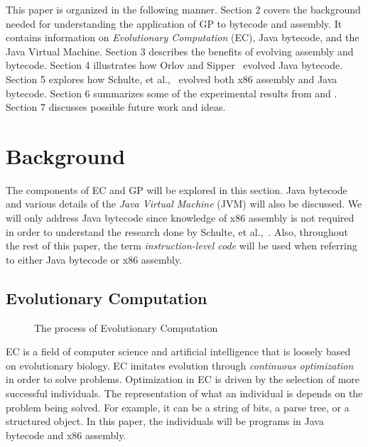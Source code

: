 \documentclass{sig-alternate}
\begin{document}
This paper is organized in the following manner. Section 2 covers the background needed for understanding the application of GP to bytecode and assembly. It contains information on \textit{Evolutionary Computation} (EC), Java bytecode, and the Java Virtual Machine. Section 3 describes the benefits of evolving assembly and bytecode. Section 4 illustrates how Orlov and Sipper~\cite{FINCH:2011} evolved Java bytecode. Section 5 explores how Schulte, et al.,~\cite{Assembly:2010} evolved both x86 assembly and Java bytecode. Section 6 summarizes some of the experimental results from \cite{FINCH:2011} and \cite{Assembly:2010}. Section 7 discusses possible future work and ideas.  
	
	

\section{Background}


The components of EC and GP will be explored in this section. Java bytecode and various details of the \textit{Java Virtual Machine} (JVM) will also be discussed. We will only address Java bytecode since knowledge of x86 assembly is not required in order to understand the research done by Schulte, et al.,~\cite{Assembly:2010}. Also, throughout the rest of this paper, the term \textit{instruction-level code} will be used when referring to either Java bytecode or x86 assembly.
\subsection{Evolutionary Computation}
\begin{figure}
\centering
{}

\caption{The process of Evolutionary Computation}
\label{ECdiagram}
\end{figure}


EC is a field of computer science and artificial intelligence that is loosely based on evolutionary biology. EC imitates evolution through \textit{continuous optimization} in order to solve problems. Optimization in EC is driven by the selection of more successful individuals. The representation of what an individual is depends on the problem being solved. For example, it can be a string of bits, a parse tree, or a structured object. In this paper, the individuals will be programs in Java bytecode and x86 assembly.\par 
\end{document}
